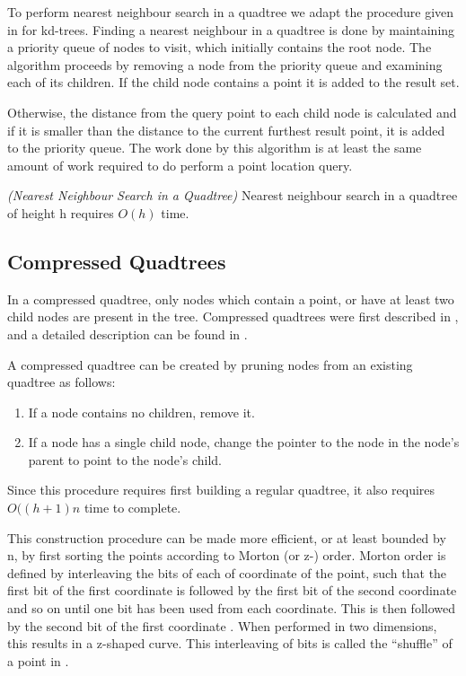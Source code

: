 \documentclass[mcs]{scsthesis}
\begin{document}
To perform nearest neighbour search in a quadtree we adapt the procedure given
in \cite{samet} for kd-trees. Finding a nearest neighbour in a quadtree is done
by maintaining a priority queue of nodes to visit, which initially contains the
root node. The algorithm proceeds by removing a node from the priority queue and
examining each of its children. If the child node contains a point it is added
to the result set.

Otherwise, the distance from the query point to each child node is calculated
and if it is smaller than the distance to the current furthest result point,
it is added to the priority queue. The work done by this algorithm is at
least the same amount of work required to do perform a point location query.

\begin{thm} \emph{(Nearest Neighbour Search in a Quadtree)} 
Nearest neighbour search in a quadtree of height h requires \(O(h)\) time.
\end{thm}

\subsection{Compressed Quadtrees}

In a compressed quadtree, only nodes which contain a point, or have at least
two child nodes are present in the tree. Compressed quadtrees were first
described in \cite{compressedquadtree}, and a detailed description can be found
in \cite{skipquadtree}.

A compressed quadtree can be created by pruning nodes from an existing quadtree
as follows:

\begin{enumerate}
\item If a node contains no children, remove it.
\item If a node has a single child node, change the pointer to the node in the
node's parent to point to the node's child.
\end{enumerate}

Since this procedure requires first building a regular quadtree, it also
requires \(O((h + 1)n\) time to complete.

This construction procedure can be made more efficient, or at least bounded by
n, by first sorting the points according to Morton (or z-) order. Morton order
is defined by interleaving the bits of each of coordinate of the point, such
that the first bit of the first coordinate is followed by the first bit of the
second coordinate and so on until one bit has been used from each coordinate.
This is then followed by the second bit of the first coordinate \cite{morton}.
When performed in two dimensions, this results in a z-shaped curve. This
interleaving of bits is called the ``shuffle'' of a point in \cite{bern}.
\end{document}
